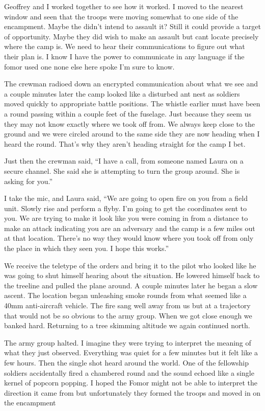 Geoffrey and I worked together to see how it worked. I moved to the nearest window and seen that the troops were moving somewhat to one side of the encampment. Maybe the didn't intend to assault it? Still it could provide a target of opportunity. Maybe they did wish to make an assault but cant locate precisely where the camp is. We need to hear their communications to figure out what their plan is. I know I have the power to communicate in any language if the fomor used one none else here spoke I'm sure to know.

The crewman radioed down an encrypted communication about what we see and a couple minutes later the camp looked like a disturbed ant nest as soldiers moved quickly to appropriate battle positions. The whistle earlier must have been a round passing within a couple feet of the fuselage. Just because they seem us they may not know exactly where we took off from. We always keep close to the ground and we were circled around to the same side they are now heading when I heard the round. That's why they aren't heading straight for the camp I bet.

Just then the crewman said, ``I have a call, from someone named Laura on a secure channel. She said she is attempting to turn the group around. She is asking for you.''

I take the mic, and Laura said, ``We are going to open fire on you from a field unit. Slowly rise and perform a flyby. I'm going to get the coordinates sent to you. We are trying to make it look like you were coming in from a distance to make an attack indicating you are an adversary and the camp is a few miles out at that location. There's no way they would know where you took off from only the place in which they seen you. I hope this works.''

We receive the teletype of the orders and bring it to the pilot who looked like he was going to shut himself hearing about the situation. He lowered himself back to the treeline and pulled the plane around. A couple minutes later he began a slow ascent. The location began unleashing smoke rounds from what seemed like a 40mm anti-aircraft vehicle. The fire sang well away from us but at a trajectory that would not be so obvious to the army group. When we got close enough we banked hard. Returning to a tree skimming altitude we again continued north.

The army group halted. I imagine they were trying to interpret the meaning of what they just observed. Everything was quiet for a few minutes but it felt like a few hours. Then the single shot heard around the world. One of the fellowship soldiers accidentally fired a chambered round and the sound echoed like a single kernel of popcorn popping. I hoped the Fomor might not be able to interpret the direction it came from but unfortunately they formed the troops and moved in on the encampment

